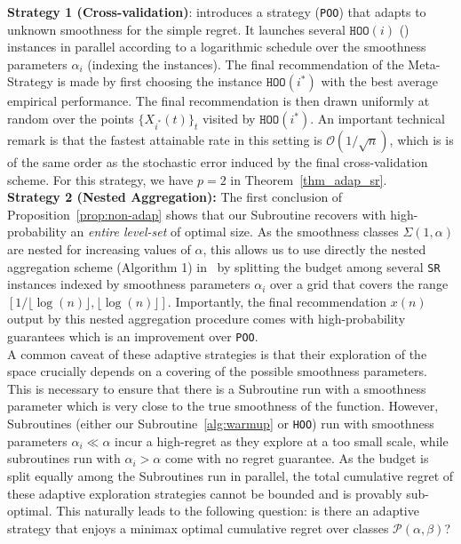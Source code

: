 \documentclass[final,12pt]{colt2018}
\newcommand{\bigO}[1]{\mathcal O\left( #1 \right)}
\newcommand{\floor}[1]{\lfloor #1 \rfloor}
\begin{document}
\textbf{Strategy 1 (Cross-validation)}: \cite{grill2015black} introduces a strategy (\texttt{POO}) that adapts to unknown smoothness for the simple regret. It launches several $\texttt{HOO}(i)$ (\cite{bubeck2011x}) instances in parallel according to a logarithmic schedule over the smoothness parameters $\alpha_i$ (indexing the instances). The final recommendation of the Meta-Strategy is made by first choosing the instance $\texttt{HOO}(i^*)$ with the best average empirical performance. The final recommendation is then drawn uniformly at random over the points $\{X_{i^*}(t)\}_t$ visited by $\texttt{HOO}(i^*)$. An important technical remark is that the fastest attainable rate in this setting is $\bigO{1/\sqrt{n}}$, which is is of the same order as the stochastic error induced by the final cross-validation scheme. For this strategy, we have $p = 2$ in Theorem~\ref{thm_adap_sr}.\\

\textbf{Strategy 2 (Nested Aggregation):} The first conclusion of Proposition~\ref{prop:non-adap} shows that our Subroutine recovers with high-probability an \emph{entire level-set} of optimal size. As the smoothness classes $\Sigma(1, \alpha)$ are nested for increasing values of $\alpha$, this allows us to use directly the nested aggregation scheme (Algorithm 1) in~\cite{locatelli2017adaptivity} by splitting the budget among several \texttt{SR} instances indexed by smoothness parameters $\alpha_i$ over a grid that covers the range $[1/\floor{\log(n)}, \floor{\log(n)}]$. Importantly, the final recommendation $x(n)$ output by this nested aggregation procedure comes with high-probability guarantees which is an improvement over \texttt{POO}.\\

A common caveat of these adaptive strategies is that their exploration of the space crucially depends on a covering of the possible smoothness parameters. This is necessary to ensure that there is a Subroutine run with a smoothness parameter which is very close to the true smoothness of the function. However, Subroutines (either our Subroutine~\ref{alg:warmup} or \texttt{HOO}) run with smoothness parameters $\alpha_i \ll \alpha$ incur a high-regret as they explore at a too small scale, while subroutines run with $\alpha_i > \alpha$ come with no regret guarantee. As the budget is split equally among the Subroutines run in parallel, the total cumulative regret of these adaptive exploration strategies cannot be bounded and is provably sub-optimal. This  naturally leads to the following question: is there an adaptive strategy that enjoys a minimax optimal cumulative regret over classes $\mathcal P(\alpha,\beta)$?
\end{document}
